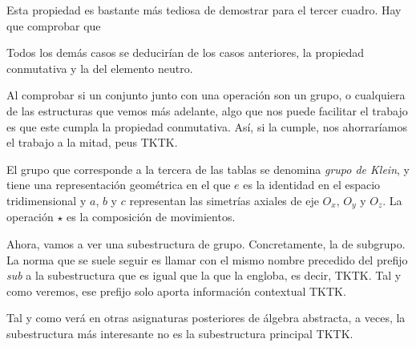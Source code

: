 Esta propiedad es bastante más tediosa de demostrar para el tercer cuadro.
Hay que comprobar que 

\iffalse
\begin{align*}
  a \star (b \star c) &= (a \star b) \star c, \quad a \star (c \star b) = (a
    \star c) \star b, \quad a \star ((a \star c)) = ((a \star a) \star c) \\

  a \star (c \star a) &= ((a \star c) \star a), \quad a \star (a \star b) =
    ((a \star a) \star b), \quad a \star (b \star c) = ((b \star b) \star c)
    \\

  b \star (c \star b) &= ((b \star c) \star b), \quad b \star (b \star a) =
    ((b \star b) \star a), \quad b \star (a \star b) = ((b \star a) \star b)
    \\

  c \star (a \star c) = ((c \star a) \star c), \quad c \star ((c \star b)) =
    ((c \star c) \star b), \quad c \star (b \star c) = ((c \star b) \star c)
    \\
\end{align*}
\fi

Todos los demás casos se deducirían de los casos anteriores, la propiedad
conmutativa y la del elemento neutro.

Al comprobar si un conjunto junto con una operación son un grupo, o
cualquiera de las estructuras que vemos más adelante, algo que nos puede
facilitar el trabajo es que este cumpla la propiedad conmutativa. Así, si la
cumple, nos ahorraríamos el trabajo a la mitad, peus TKTK.

El grupo que corresponde a la tercera de las tablas se denomina \emph{grupo
de Klein}, y tiene una representación geométrica en el que $e$ es la
identidad en el espacio tridimensional y $a$, $b$ y $c$ representan las
simetrías axiales de eje $O_x$, $O_y$ y $O_z$. La operación $\star$ es la
composición de movimientos.

Ahora, vamos a ver una subestructura de grupo. Concretamente, la de
subgrupo. La norma que se suele seguir es llamar con el mismo nombre
precedido del prefijo \emph{sub} a la subestructura que es igual que la que
la engloba, es decir, TKTK. Tal y como veremos, ese prefijo solo aporta
información contextual TKTK.

Tal y como verá en otras asignaturas posteriores de álgebra abstracta, a
veces, la subestructura más interesante no es la subestructura principal
TKTK.





